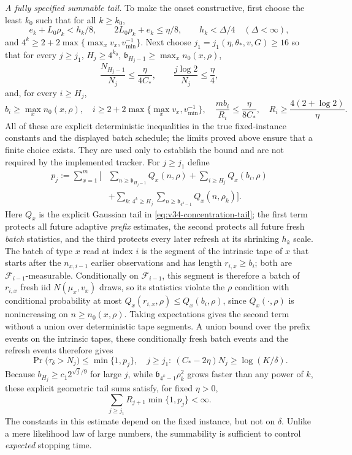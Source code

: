 \documentclass{article}
\theoremstyle{plain}
\theoremstyle{definition}
\begin{document}
\emph{A fully specified summable tail.}
To make the onset constructive, first choose the least $k_0$ such
that for all $k\ge k_0$,
\[
 e_k+L_0\rho_k<h_k/8,\qquad
 2L_0\rho_k+e_k\le\eta/8,\qquad
 h_k<\Delta/4\quad(\Delta<\infty),
\]
and $4^k\ge2+2\max\{\max_xv_x,v_{\min}^{-1}\}$.
Next choose $j_1=j_1(\eta,\theta_*,v,G)\ge16$ so that for every
$j\ge j_1$, $H_j\ge4^{k_0}$,
$\mathfrak b_{H_j-1}\ge\max_x n_0(x,\rho)$,
\[
 \frac{N_{H_j-1}}{N_j}\le\frac{\eta}{4C_*},
 \qquad \frac{j\log2}{N_j}\le\frac\eta4,
\]
and, for every $i\ge H_j$,
\[
 b_i\ge\max_x n_0(x,\rho),\quad
 i\ge2+2\max\{\max_xv_x,v_{\min}^{-1}\},\quad
 \frac{mb_i}{R_i}\le\frac\eta{8C_*},\quad
 R_i\ge\frac{4(2+\log2)}\eta.
\]
All of these are explicit deterministic inequalities in the true
fixed-instance constants and the displayed batch schedule; the limits
proved above ensure that a finite choice exists. They are used only to
establish the bound and are not required by the implemented tracker.
For $j\ge j_1$ define
\begin{equation}
 \begin{split}
 p_j:=\sum_{x=1}^m\biggl[&
  \sum_{n\ge\mathfrak b_{H_j-1}}Q_x(n,\rho)
  +\sum_{i\ge H_j}Q_x(b_i,\rho)\\[-3pt]
  &+\sum_{k:\,4^k\ge H_j}
       \sum_{n\ge\mathfrak b_{4^k-1}}Q_x(n,\rho_k)
 \biggr].
 \end{split}
 \label{eq:v34-explicit-tail}
\end{equation}
Here $Q_x$ is the explicit Gaussian tail in
\eqref{eq:v34-concentration-tail}; the first term protects all
future adaptive \emph{prefix} estimates, the second protects all
future fresh \emph{batch} statistics, and the third protects every
later refresh at its shrinking $h_k$ scale. The batch of type $x$
read at index $i$ is the segment of the intrinsic tape of $x$ that
starts after the $n_{x,i-1}$ earlier observations and has length
$r_{i,x}\ge b_i$; both are $\mathcal F_{i-1}$-measurable. Conditionally
on $\mathcal F_{i-1}$, this segment is therefore a batch of $r_{i,x}$
fresh iid $N(\mu_x,v_x)$ draws, so its statistics violate the $\rho$
condition with conditional probability at most
$Q_x(r_{i,x},\rho)\le Q_x(b_i,\rho)$, since $Q_x(\cdot,\rho)$ is
nonincreasing on $n\ge n_0(x,\rho)$. Taking expectations gives the
second term without a union over deterministic tape segments.
A union bound over the prefix events on the intrinsic tapes, these
conditionally fresh batch events and the refresh events therefore gives
\begin{equation}
 \Pr\bigl(\tau_\delta>N_j\bigr)\le\min\{1,p_j\},
 \quad j\ge j_1:\ (C_*-2\eta)N_j\ge\log(K/\delta).
 \label{eq:v34-tail-stop}
\end{equation}
Because $b_{H_j}\ge c_1 2^{\sqrt j/9}$ for large $j$, while
$\mathfrak b_{4^k-1}\rho_k^2$ grows faster than any power of $k$,
these explicit geometric tail sums satisfy, for fixed $\eta>0$,
\begin{equation}
 \sum_{j\ge j_1}R_{j+1}\min\{1,p_j\}<\infty.
 \label{eq:v34-tail-summability}
\end{equation}
The constants in this estimate depend on the fixed instance, but not
on $\delta$. Unlike a mere likelihood law of large numbers, the
summability is sufficient to control \emph{expected} stopping time.
\end{document}
